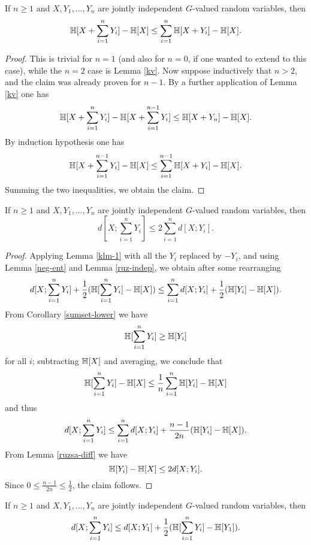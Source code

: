 \begin{lemma}\label{klm-1}  If $n \geq 1$ and $X, Y_1, \dots, Y_n$ are jointly independent $G$-valued random variables, then
  $$ \mathbb{H}[X + \sum_{i=1}^n Y_i] - \mathbb{H}[X] \leq \sum_{i=1}^n \mathbb{H}[X+Y_i] - \mathbb{H}[X].$$
\end{lemma}

\begin{proof}  This is trivial for $n=1$ (and also for $n=0$, if one wanted to extend to this case), while the $n=2$ case is Lemma \ref{kv}.  Now suppose inductively that $n > 2$, and the claim was already proven for $n-1$.  By a further application of Lemma \ref{kv} one has
$$  \mathbb{H}[X + \sum_{i=1}^n Y_i] -  \mathbb{H}[X + \sum_{i=1}^{n-1} Y_i] \leq \mathbb{H}[X+Y_n] - \mathbb{H}[X].$$
By induction hypothesis one has
$$ \mathbb{H}[X + \sum_{i=1}^{n-1} Y_i] - \mathbb{H}[X] \leq \sum_{i=1}^{n-1} \mathbb{H}[X+Y_i] - \mathbb{H}[X].$$
Summing the two inequalities, we obtain the claim.
\end{proof}

\begin{lemma}\label{klm-2}  If $n \geq 1$ and $X, Y_1, \dots, Y_n$ are jointly independent $G$-valued random variables, then
  $$ d[X; \sum_{i=1}^n Y_i] \leq 2 \sum_{i=1}^n d[X; Y_i].$$
\end{lemma}

\begin{proof}
  Applying Lemma \ref{klm-1} with all the $Y_i$ replaced by $-Y_i$, and using Lemma \ref{neg-ent} and Lemma \ref{ruz-indep}, we obtain after some rearranging
$$ d[X; \sum_{i=1}^n Y_i] + \frac{1}{2} (\mathbb{H}[\sum_{i=1}^n Y_i] - \mathbb{H}[X]) \leq \sum_{i=1}^n d[X;Y_i] + \frac{1}{2} (\mathbb{H}[Y_i] - \mathbb{H}[X]).$$
From Corollary \ref{sumset-lower} we have
$$ \mathbb{H}[\sum_{i=1}^n Y_i] \geq \mathbb{H}[Y_i]$$
for all $i$; subtracting $\mathbb{H}[X]$ and averaging, we conclude that
$$ \mathbb{H}[\sum_{i=1}^n Y_i] - \mathbb{H}[X] \leq \frac{1}{n} \sum_{i=1}^n \mathbb{H}[Y_i] - \mathbb{H}[X]$$
and thus
$$ d[X; \sum_{i=1}^n Y_i] \leq \sum_{i=1}^n d[X;Y_i] + \frac{n-1}{2n} (\mathbb{H}[Y_i] - \mathbb{H}[X]).$$
From Lemma \ref{ruzsa-diff} we have
$$ \mathbb{H}[Y_i] - \mathbb{H}[X] \leq 2 d[X;Y_i].$$
Since $0 \leq \frac{n-1}{2n} \leq \frac{1}{2}$, the claim follows.
\end{proof}

\begin{lemma}\label{klm-3}  If $n \geq 1$ and $X, Y_1, \dots, Y_n$ are jointly independent $G$-valued random variables, then
  $$ d[X; \sum_{i=1}^n Y_i] \leq d[X; Y_1] + \frac{1}{2}(\mathbb{H}[ \sum_{i=1}^n Y_i ] - \mathbb{H}[Y_1]).$$
\end{lemma}

